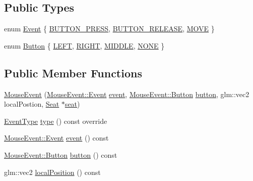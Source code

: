 \subsection*{Public Types}
\begin{DoxyCompactItemize}
\item 
enum \hyperlink{classmotorcar_1_1MouseEvent_a2d063fb053a90c196b58c1dec4d989aa}{Event} \{ \hyperlink{classmotorcar_1_1MouseEvent_a2d063fb053a90c196b58c1dec4d989aaa566f527f2ad7bd86d18ae6fc33cd0d15}{B\-U\-T\-T\-O\-N\-\_\-\-P\-R\-E\-S\-S}, 
\hyperlink{classmotorcar_1_1MouseEvent_a2d063fb053a90c196b58c1dec4d989aaab71770cff8c9b00629bf59ec4fa806c4}{B\-U\-T\-T\-O\-N\-\_\-\-R\-E\-L\-E\-A\-S\-E}, 
\hyperlink{classmotorcar_1_1MouseEvent_a2d063fb053a90c196b58c1dec4d989aaa679f8c98a12aeb73e9e3891cf48a964a}{M\-O\-V\-E}
 \}
\item 
enum \hyperlink{classmotorcar_1_1MouseEvent_aeb5515c2434123ce2f897f8fc89effae}{Button} \{ \hyperlink{classmotorcar_1_1MouseEvent_aeb5515c2434123ce2f897f8fc89effaead2303cd4e996a291b8a55dff0d44130c}{L\-E\-F\-T}, 
\hyperlink{classmotorcar_1_1MouseEvent_aeb5515c2434123ce2f897f8fc89effaea9988f559d0b0dc2ecd80f7325a7091e2}{R\-I\-G\-H\-T}, 
\hyperlink{classmotorcar_1_1MouseEvent_aeb5515c2434123ce2f897f8fc89effaea7e41ded0faa1ee5f90c5df6adc9d76c3}{M\-I\-D\-D\-L\-E}, 
\hyperlink{classmotorcar_1_1MouseEvent_aeb5515c2434123ce2f897f8fc89effaea18194aa8373867605b8527cbb1d268a8}{N\-O\-N\-E}
 \}
\end{DoxyCompactItemize}
\subsection*{Public Member Functions}
\begin{DoxyCompactItemize}
\item 
\hyperlink{classmotorcar_1_1MouseEvent_ac29d5c7d5c7e4176828f2b671458c25b}{Mouse\-Event} (\hyperlink{classmotorcar_1_1MouseEvent_a2d063fb053a90c196b58c1dec4d989aa}{Mouse\-Event\-::\-Event} \hyperlink{classmotorcar_1_1MouseEvent_a52d0060d0793eab0ca6aad7f69d78fda}{event}, \hyperlink{classmotorcar_1_1MouseEvent_aeb5515c2434123ce2f897f8fc89effae}{Mouse\-Event\-::\-Button} \hyperlink{classmotorcar_1_1MouseEvent_a6682d4092f940335170806435e3bb6fe}{button}, glm\-::vec2 local\-Postion, \hyperlink{classmotorcar_1_1Seat}{Seat} $\ast$\hyperlink{classmotorcar_1_1Event_a7426828c8402193cac63a7b3fda5a17e}{seat})
\item 
\hyperlink{classmotorcar_1_1Event_af4f5d9ed7dc2d8a2324fa5b0d32c29b0}{Event\-Type} \hyperlink{classmotorcar_1_1MouseEvent_afb419c29a7d2fa6dd429eeb3ac0699c5}{type} () const override
\item 
\hyperlink{classmotorcar_1_1MouseEvent_a2d063fb053a90c196b58c1dec4d989aa}{Mouse\-Event\-::\-Event} \hyperlink{classmotorcar_1_1MouseEvent_a52d0060d0793eab0ca6aad7f69d78fda}{event} () const 
\item 
\hyperlink{classmotorcar_1_1MouseEvent_aeb5515c2434123ce2f897f8fc89effae}{Mouse\-Event\-::\-Button} \hyperlink{classmotorcar_1_1MouseEvent_a6682d4092f940335170806435e3bb6fe}{button} () const 
\item 
glm\-::vec2 \hyperlink{classmotorcar_1_1MouseEvent_aaadbd8608dd2e0ed6d3836f0947f2141}{local\-Position} () const 
\end{DoxyCompactItemize}


